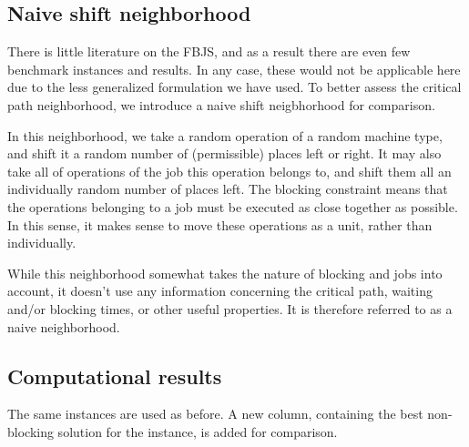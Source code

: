 \documentclass[a4paper,10pt]{article}
\begin{document}
\subsection{Naive shift neighborhood}

There is little literature on the FBJS, and as a result there are even few benchmark instances and results. In any case, these would not be applicable here due to the less generalized formulation we have used. To better assess the critical path neighborhood, we introduce a naive shift neigbhorhood for comparison.

In this neighborhood, we take a random operation of a random machine type, and shift it a random number of (permissible) places left or right. It may also take all of operations of the job this operation belongs to, and shift them all an individually random number of places left. The blocking constraint means that the operations belonging to a job must be executed as close together as possible. In this sense, it makes sense to move these operations as a unit, rather than individually.

While this neighborhood somewhat takes the nature of blocking and jobs into account, it doesn't use any information concerning the critical path, waiting and/or blocking times, or other useful properties. It is therefore referred to as a naive neighborhood.

\subsection{Computational results}

The same instances are used as before. A new column, containing the best non-blocking solution for the instance, is added for comparison.
\end{document}
